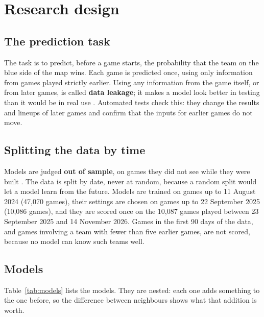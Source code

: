 \documentclass[12pt,a4paper]{article}
\begin{document}
\section{Research design}\label{sec:method}

\subsection{The prediction task}

The task is to predict, before a game starts, the probability that the team on the blue side of the map wins. Each game is predicted once, using only information from games played strictly earlier. Using any information from the game itself, or from later games, is called \textbf{data leakage}; it makes a model look better in testing than it would be in real use \citep{kaufman2012}. Automated tests check this: they change the results and lineups of later games and confirm that the inputs for earlier games do not move.

\subsection{Splitting the data by time}

Models are judged \textbf{out of sample}, on games they did not see while they were built \citep{tashman2000}. The data is split by date, never at random, because a random split would let a model learn from the future. Models are trained on games up to 11 August 2024 (47,070 games), their settings are chosen on games up to 22 September 2025 (10,086 games), and they are scored once on the 10,087 games played between 23 September 2025 and 14 November 2026. Games in the first 90 days of the data, and games involving a team with fewer than five earlier games, are not scored, because no model can know such teams well.

\subsection{Models}

Table~\ref{tab:models} lists the models. They are nested: each one adds something to the one before, so the difference between neighbours shows what that addition is worth.
\end{document}
